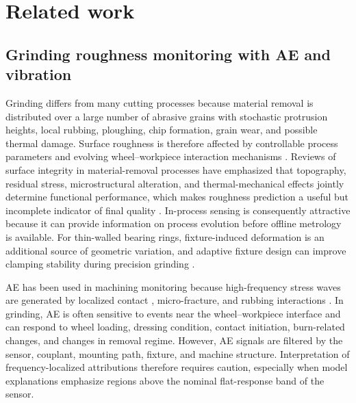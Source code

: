 \section{Related work}\label{related-work}

\subsection{Grinding roughness monitoring with AE and vibration}\label{rw:ae-vibration}

Grinding differs from many cutting processes because material removal is distributed over a large number of abrasive grains with stochastic protrusion heights, local rubbing, ploughing, chip formation, grain wear, and possible thermal damage. Surface roughness is therefore affected by controllable process parameters and evolving wheel--workpiece interaction mechanisms \cite{tonshoff1992acoustic,Brinksmeier2006}. Reviews of surface integrity in material-removal processes have emphasized that topography, residual stress, microstructural alteration, and thermal-mechanical effects jointly determine functional performance, which makes roughness prediction a useful but incomplete indicator of final quality \cite{Jawahir2011}. In-process sensing is consequently attractive because it can provide information on process evolution before offline metrology is available. For thin-walled bearing rings, fixture-induced deformation is an additional source of geometric variation, and adaptive fixture design can improve clamping stability during precision grinding \cite{Shi2025FlexibleFixture}.

AE has been used in machining monitoring because high-frequency stress waves are generated by localized contact \cite{Dornfeld1992}, micro-fracture, and rubbing interactions \cite{Teti2010}. In grinding, AE is often sensitive to events near the wheel--workpiece interface and can respond to wheel loading, dressing condition, contact initiation, burn-related changes, and changes in removal regime. However, AE signals are filtered by the sensor, couplant, mounting path, fixture, and machine structure. Interpretation of frequency-localized attributions therefore requires caution, especially when model explanations emphasize regions above the nominal flat-response band of the sensor.

